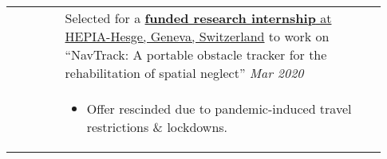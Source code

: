 \documentclass[letterpaper, 10pt, oneside]{article}
\begin{document}
\begin{longtable}{@{} p{0.13\linewidth} p{0.8\linewidth}}
                         & Selected for a \href{https://drive.google.com/file/d/1Rtlu6aHQKXntWhfEUcgB5tuNYMuvH04b}{\textbf{funded research internship} at HEPIA-Hesge, Geneva, Switzerland}
    to work on ``NavTrack: A portable obstacle tracker for the rehabilitation of spatial neglect''           \hfill \textsl{Mar 2020}                                                                                                        \\
                         & \parbox{0.8\textwidth}{                                                                                                                                                                                           %
        \begin{itemize}[leftmargin=6ex, itemsep=-0.88ex, topsep=-0.88ex]
            \item Offer rescinded due to pandemic-induced travel restrictions \& lockdowns. \\
        \end{itemize}
    }
\end{longtable}
\end{document}
